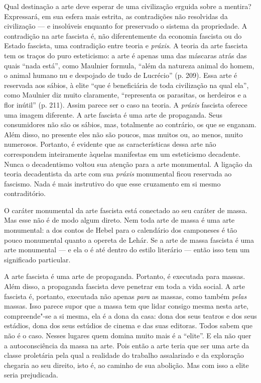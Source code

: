 Qual destinação a arte deve esperar de uma civilização erguida sobre a
mentira? Expressará, em sua esfera mais estrita, as contradições não resolvidas da civilização --- e insolúveis enquanto for preservado o sistema da propriedade.
A contradição na arte fascista é, não diferentemente da economia
fascista ou do Estado fascista, uma contradição entre teoria e
\emph{práxis}. A teoria da arte fascista tem os traços do puro
esteticismo: a arte é apenas uma das máscaras atrás das quais ``nada
está'', como Maulnier formula, ``além da natureza animal do homem, o
animal humano nu e despojado de tudo de Lucrécio'' (p. 209). Essa arte é
reservada aos sábios, à elite ``que é beneficiária de toda civilização
na qual ela'', como Maulnier diz muito claramente, ``representa os
parasitas, os herdeiros e a flor inútil'' (p. 211). Assim parece ser o
caso na teoria. A \emph{práxis} fascista oferece uma imagem diferente.
A arte fascista é uma arte de propaganda. Seus consumidores não são os
sábios, mas, totalmente ao contrário, os que se enganam. Além disso, no
presente eles não são poucos, mas muitos ou, ao menos, muito numerosos.
Portanto, é evidente que as características dessa arte não correspondem
inteiramente àquelas manifestas em um esteticismo decadente. Nunca o
decadentismo voltou sua atenção para a arte monumental. A ligação da
teoria decadentista da arte com sua \emph{práxis} monumental ficou
reservada ao fascismo. Nada é mais instrutivo do que esse cruzamento
em si mesmo contraditório.

O caráter monumental da arte fascista está conectado ao seu caráter de
massa. Mas esse não é de modo algum direto. Nem toda arte de massa é uma
arte monumental: a dos contos de Hebel para o calendário dos camponeses
é tão pouco monumental quanto a opereta de Lehár. Se a arte de massa fascista
é uma arte monumental --- e ela o é até dentro do estilo literário ---
então isso tem um significado particular.

A arte fascista é uma arte de propaganda. Portanto, é executada para
massas. Além disso, a propaganda fascista deve penetrar em toda a vida
social. A arte fascista é, portanto, executada não apenas \emph{para} as
massas, como também \emph{pelas} massas. Isso parece supor que a massa
tem que lidar consigo mesma nesta arte, compreende"-se a si mesma, ela é a
dona da casa: dona dos seus teatros e dos seus estádios, dona dos seus
estúdios de cinema e das suas editoras. Todos sabem que não é o caso.
Nesses lugares quem domina muito mais é a ``elite''. E ela não quer a
autoconsciência da massa na arte. Pois então a arte teria que ser uma
arte da classe proletária pela qual a realidade do trabalho assalariado
e da exploração chegaria ao seu direito, isto é, ao caminho de sua
abolição. Mas com isso a elite seria prejudicada.

